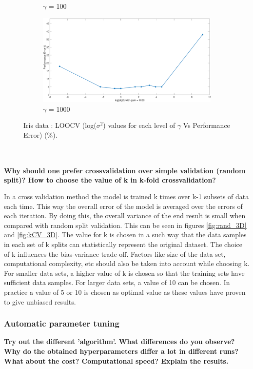 \documentclass[12pt]{report}
\begin{document}
{\begin{figure}[!htbp]
\begin{floatrow}
{\begin{subfigure}{.3\textwidth}
				\caption{$\gamma$ = 100}
				\label{fig:loo_gamma(100)}
			\end{subfigure}%
			\begin{subfigure}{.3\textwidth}
				\includegraphics[height=0.35\linewidth,width=0.7\linewidth]{Ex1.3_loo_gam(1000).eps}
				\caption{$\gamma$ = 1000}
				\label{fig:loo_gamma(1000)}
			\end{subfigure}%
		}{%
			\caption{Iris data : LOOCV (log($\sigma^2$) values for each level of $\gamma$ Vs Performance Error)  (\%).}\label{fig:loo_gam}
		}
	\end{floatrow}
\end{figure}\\\\
\textbf{Why should one prefer crossvalidation over simple validation (random split)? How to choose the value of k in k-fold crossvalidation?}

In a cross validation method the model is trained k times over k-1 subsets of data
each time. This way the overall error of the model is averaged over the errors of each iteration. By doing this, the overall variance of the end result is small when compared with random split validation. This can be seen in figures \ref{fig:rand_3D} and \ref{fig:kCV_3D}. The value for k is chosen in a such way that the data samples in each set of k splits can statistically represent the original dataset. The choice of k influences the bias-variance trade-off. Factors like size of the data set, computational complexity, etc should also be taken into account while choosing k. For smaller data sets, a higher value of k is chosen so that the training sets have sufficient data samples. For larger data sets, a value of 10 can be chosen. In practice a value of 5 or 10 is chosen as optimal value as these values have proven to give unbiased results.
\subsubsection{Automatic parameter tuning}
\textbf{Try out the different ’algorithm’. What differences do you observe? Why do the obtained hyperparameters differ a lot in different runs? What about the cost? Computational speed? Explain the results.}

}
\end{document}
